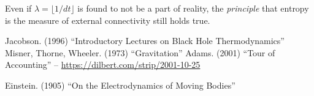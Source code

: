 \documentclass[12pt]{article}
\begin{document}
Even if $\lambda = \lfloor{1}/{dt} \rfloor$ is found to not be a part of reality, the {\textit{principle}} that {{entropy is the measure of external connectivity}} still holds true.



\pagebreak


\begin{thebibliography}{9}
 Jacobson. (1996) ``Introductory Lectures on Black Hole Thermodynamics''
 Misner, Thorne, Wheeler. (1973) ``Gravitation''
 Adams. (2001) ``Tour of Accounting'' -- \url{https://dilbert.com/strip/2001-10-25}

 Einstein. (1905) ``On the Electrodynamics of Moving Bodies''

\end{thebibliography}
\end{document}
